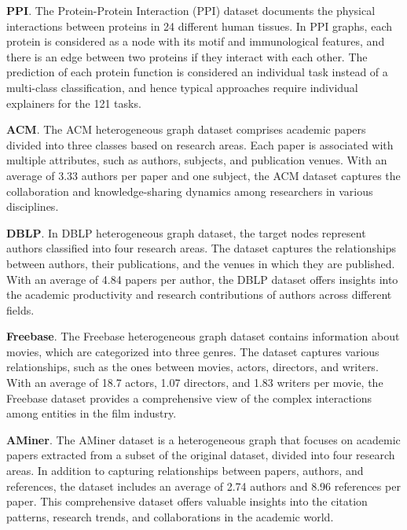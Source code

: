 \documentclass[11pt]{article}
\begin{document}
\textbf{PPI}. The Protein-Protein Interaction (PPI) \cite{zitnik2017predicting} dataset documents the physical interactions between proteins in 24 different human tissues. In PPI graphs, each protein is considered as a node with its motif and immunological features, and there is an edge between two proteins if they interact with each other. The prediction of each protein function is considered an individual task instead of a multi-class classification, and hence typical approaches require individual explainers for the 121 tasks.

\textbf{ACM}. The ACM \cite{zhao2020network} heterogeneous graph dataset comprises academic papers divided into three classes based on research areas. Each paper is associated with multiple attributes, such as authors, subjects, and publication venues. With an average of 3.33 authors per paper and one subject, the ACM dataset captures the collaboration and knowledge-sharing dynamics among researchers in various disciplines.

\textbf{DBLP}. In DBLP \cite{Fu_2020} heterogeneous graph dataset, the target nodes represent authors classified into four research areas. The dataset captures the relationships between authors, their publications, and the venues in which they are published. With an average of 4.84 papers per author, the DBLP dataset offers insights into the academic productivity and research contributions of authors across different fields.

\textbf{Freebase}. The Freebase \cite{li2021leveraging} heterogeneous graph dataset contains information about movies, which are categorized into three genres. The dataset captures various relationships, such as the ones between movies, actors, directors, and writers. With an average of 18.7 actors, 1.07 directors, and 1.83 writers per movie, the Freebase dataset provides a comprehensive view of the complex interactions among entities in the film industry.

\textbf{AMiner}. The AMiner dataset \cite{hu2019adversarial} is a heterogeneous graph that focuses on academic papers extracted from a subset of the original dataset, divided into four research areas. In addition to capturing relationships between papers, authors, and references, the dataset includes an average of 2.74 authors and 8.96 references per paper. This comprehensive dataset offers valuable insights into the citation patterns, research trends, and collaborations in the academic world.
\end{document}
